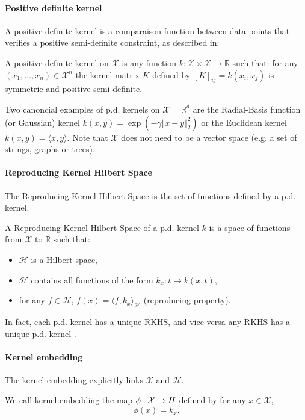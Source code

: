 \paragraph{Positive definite kernel} A positive definite kernel is a comparaison function between data-points that verifies a positive semi-definite constraint, as described in:
\begin{mdframed}
\begin{definition}
A positive definite kernel on $\mathcal X$ is any function $k: \mathcal X \times \mathcal X \to \mathbb R$ such that: for any $(x_1, \ldots, x_n)\in\mathcal X^n$ the kernel matrix $K$ defined by $[K]_{ij} = k(x_i, x_j)$ is symmetric and positive semi-definite.
\end{definition}
\end{mdframed}
Two canoncial examples of p.d. kernels on $\mathcal X = \mathbb R^d$ are the Radial-Basis function (or Gaussian) kernel $k(x, y) = \exp(-\gamma \Vert x - y \Vert_2^2)$ or the Euclidean kernel $k(x, y) = \langle x, y \rangle$. Note that $\mathcal X$ does not need to be a vector space (e.g. a set of strings, graphs or trees).

\paragraph{Reproducing Kernel Hilbert Space}
The Reproducing Kernel Hilbert Space is the set of functions defined by a p.d. kernel.
\begin{mdframed}
\begin{definition}
A Reproducing Kernel Hilbert Space of a p.d. kernel $k$ is a space of functions from $\mathcal X$ to $\mathbb R$ such that:
\begin{itemize}
\item $\mathcal H$ is a Hilbert space,
\item $\mathcal H$ contains all functions of the form $k_x: t\mapsto k(x, t)$,
\item for any $f\in\mathcal H$, $f(x) = \langle f, k_x\rangle_\mathcal H$ (reproducing property).
\end{itemize}
\end{definition}
\end{mdframed}
In fact, each p.d. kernel has a unique RKHS, and vice versa any RKHS has a unique p.d. kernel \citep{aronszajn1950theory}.

\paragraph{Kernel embedding}
The kernel embedding explicitly links $\mathcal X$ and $\mathcal H$.
\begin{mdframed}
\begin{definition}
We call kernel embedding the map $\phi: \mathcal X \to \mathbb \mathcal H$ defined by for any $x\in\mathcal X$,
$$ \phi(x) = k_x.$$
\end{definition}
\end{mdframed}


